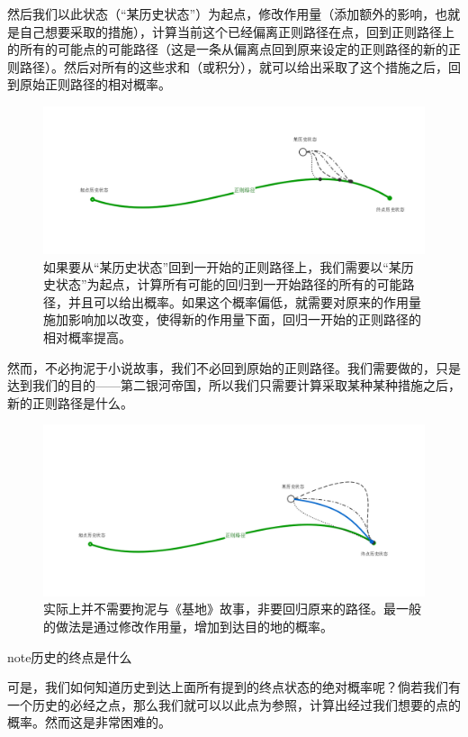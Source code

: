 \documentclass[letterpaper,10pt,english]{sphinxmanual}
\begin{document}
然后我们以此状态（“某历史状态”）为起点，修改作用量（添加额外的影响，也就是自己想要采取的措施），计算当前这个已经偏离正则路径在点，回到正则路径上的所有的可能点的可能路径（这是一条从偏离点回到原来设定的正则路径的新的正则路径）。然后对所有的这些求和（或积分），就可以给出采取了这个措施之后，回到原始正则路径的相对概率。
\begin{figure}[htbp]
\centering
\capstart

\includegraphics{psychohistory-modi.png}
\caption{如果要从“某历史状态”回到一开始的正则路径上，我们需要以“某历史状态”为起点，计算所有可能的回归到一开始路径的所有的可能路径，并且可以给出概率。如果这个概率偏低，就需要对原来的作用量施加影响加以改变，使得新的作用量下面，回归一开始的正则路径的相对概率提高。}\end{figure}

然而，不必拘泥于小说故事，我们不必回到原始的正则路径。我们需要做的，只是达到我们的目的——第二银河帝国，所以我们只需要计算采取某种某种措施之后，新的正则路径是什么。
\begin{figure}[htbp]
\centering
\capstart

\includegraphics{psychohistory-modi2.png}
\caption{实际上并不需要拘泥与《基地》故事，非要回归原来的路径。最一般的做法是通过修改作用量，增加到达目的地的概率。}\end{figure}

\begin{notice}{note}{历史的终点是什么}

可是，我们如何知道历史到达上面所有提到的终点状态的绝对概率呢？倘若我们有一个历史的必经之点，那么我们就可以以此点为参照，计算出经过我们想要的点的概率。然而这是非常困难的。
\end{notice}
\end{document}
